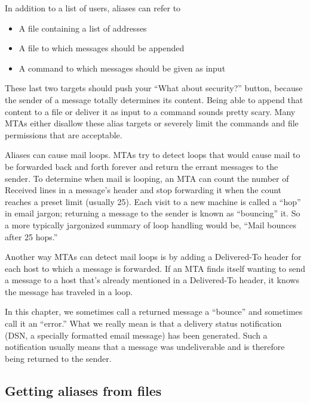 In addition to a list of users, aliases can refer to

\begin{itemize}
\item
  A file containing a list of addresses
\item
  A file to which messages should be appended
\item
  A command to which messages should be given as input
\end{itemize}

These last two targets should push your ``What about security?'' button,
because the sender of a message totally determines its content. Being
able to append that content to a file or deliver it as input to a
command sounds pretty scary. Many MTAs either disallow these alias
targets or severely limit the commands and file permissions that are
acceptable.

Aliases can cause
\protect\hypertarget{part0026_split_018.htmlux5cux23_idIndexMarker2475}{}{}mail
loops. MTAs try to detect loops that would cause mail to be forwarded
back and forth forever and return the errant messages to the sender. To
determine when mail is looping, an MTA can count the number of Received
lines in a message's header and stop forwarding it when the count
reaches a preset limit (usually 25). Each visit to a new machine is
called a ``hop'' in email jargon; returning a message to the sender is
known as ``bouncing'' it. So a more typically jargonized
\protect\hypertarget{part0026_split_018.htmlux5cux23_idIndexMarker2476}{}{}summary
of loop handling would be, ``Mail bounces after 25 hops.''

Another way MTAs can detect mail loops is by adding a Delivered-To
header for each host to which a message is forwarded. If an MTA finds
itself wanting to send a message to a host that's already mentioned in a
Delivered-To header, it knows the message has traveled in a loop.

In this chapter, we sometimes call a returned message a ``bounce'' and
sometimes call it an ``error.'' What we really mean is that a delivery
status notification (DSN, a specially formatted email message) has been
generated. Such a notification usually means that a message was
undeliverable and is therefore being returned to the sender.

\protect\hypertarget{part0026_split_019.html}{}{}

\hypertarget{part0026_split_019.htmlux5cux23_idContainer1247}{}
\hypertarget{part0026_split_019.htmlux5cux23calibre_pb_18}{%
\subsection[Getting aliases from
files]{\texorpdfstring{\protect\hypertarget{part0026_split_019.htmlux5cux23_idTextAnchor1032}{}{}Getting
aliases from
files}{Getting aliases from files}}\label{part0026_split_019.htmlux5cux23calibre_pb_18}}

